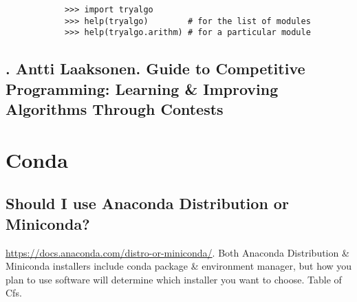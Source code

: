 \documentclass{article}
\begin{document}
\begin{itemize}
\begin{itemize}
		\begin{verbatim}
			>>> import tryalgo
			>>> help(tryalgo)		 # for the list of modules
			>>> help(tryalgo.arithm) # for a particular module
		\end{verbatim}
	\end{itemize}
\end{itemize}


\subsection{\cite{Laaksonen2020}. {\sc Antti Laaksonen}. Guide to Competitive Programming: Learning \& Improving Algorithms Through Contests}


\section{Conda}

\subsection{Should I use Anaconda Distribution or Miniconda?}
\url{https://docs.anaconda.com/distro-or-miniconda/}. Both Anaconda Distribution \& Miniconda installers include conda package \& environment manager, but how you plan to use software will determine which installer you want to choose. {\sf Table of Cfs.}
\end{document}

